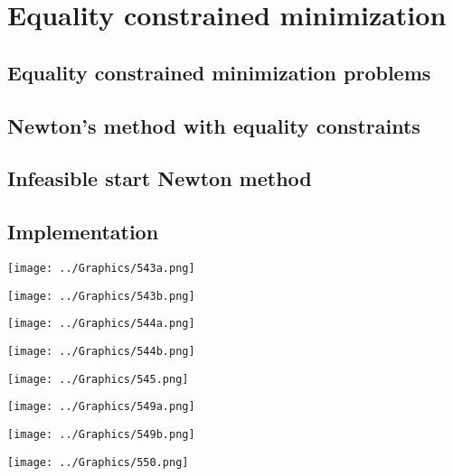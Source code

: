 \chapter{Equality constrained minimization}

\clearpage
\section{Equality constrained minimization problems}

\clearpage
\section{Newton’s method with equality constraints}

\clearpage
\section{Infeasible start Newton method}

\clearpage
\section{Implementation}


\clearpage
\hfil\texttt{[image: ../Graphics/543a.png]}\hfil

\clearpage
\hfil\texttt{[image: ../Graphics/543b.png]}\hfil

\clearpage
\hfil\texttt{[image: ../Graphics/544a.png]}\hfil

\clearpage
\hfil\texttt{[image: ../Graphics/544b.png]}\hfil

\clearpage
\hfil\texttt{[image: ../Graphics/545.png]}\hfil

\clearpage
\hfil\texttt{[image: ../Graphics/549a.png]}\hfil

\clearpage
\hfil\texttt{[image: ../Graphics/549b.png]}\hfil

\clearpage
\hfil\texttt{[image: ../Graphics/550.png]}\hfil



